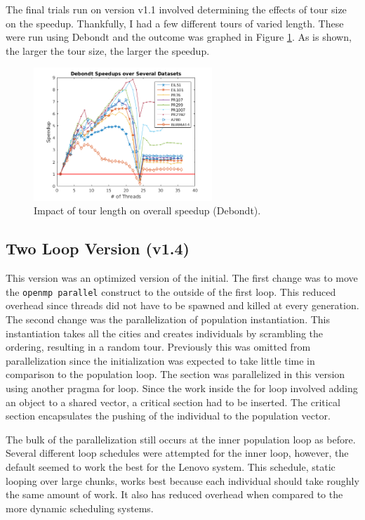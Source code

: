 \documentclass[10pt,letterpaper]{article}
\begin{document}
The final trials run on version v1.1 involved determining the effects of tour size on the speedup. Thankfully, I had a few different tours of varied length. These were run using Debondt and the outcome was graphed in Figure \ref{fig:tours}. As is shown, the larger the tour size, the larger the speedup.

\begin{figure}
\centering
\includegraphics[width=0.6\textwidth]{../img/dataset_speedups.png}
\caption{Impact of tour length on overall speedup (Debondt).}
\label{fig:tours}
\end{figure}

\clearpage
\newpage
\subsection{Two Loop Version (v1.4)}
This version was an optimized version of the initial. The first change was to move the \texttt{openmp parallel} construct to the outside of the first loop. This reduced overhead since threads did not have to be spawned and killed at every generation. The second change was the parallelization of population instantiation. This instantiation takes all the cities and creates individuals by scrambling the ordering, resulting in a random tour. Previously this was omitted from parallelization since the initialization was expected to take little time in comparison to the population loop. The section was parallelized in this version using another pragma for loop. Since the work inside the for loop involved adding an object to a shared vector, a critical section had to be inserted. The critical section encapsulates the pushing of the individual to the population vector.

The bulk of the parallelization still occurs at the inner population loop as before. Several different loop schedules were attempted for the inner loop, however, the default seemed to work the best for the Lenovo system. This schedule, static looping over large chunks, works best because each individual should take roughly the same amount of work. It also has reduced overhead when compared to the more dynamic scheduling systems.
\end{document}
